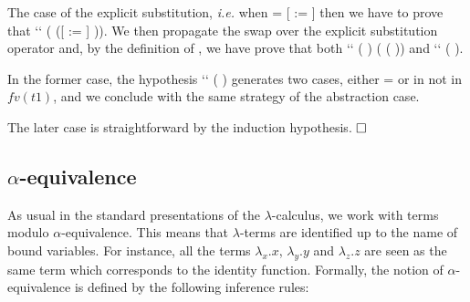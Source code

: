The case of the explicit substitution, {\it i.e.} when  = [ := ] then we have to prove that     ``  (   ([ := ] )). We then propagate the swap over the explicit substitution operator and, by the definition of , we have prove that both     ``  (   ) ( (   )) and     ``  (   ).
\begin{coqdoccode}
\end{coqdoccode}
In the former case, the hypothesis  ``   ( ) generates two cases, either  =  or  in not in $fv(t1)$, and we conclude with the same strategy of the abstraction case.
\begin{coqdoccode}
\end{coqdoccode}
The later case is straightforward by the induction hypothesis. $\hfill\Box$
\begin{coqdoccode}
\coqdocemptyline
\coqdocemptyline
\end{coqdoccode}
\subsection{$\alpha$-equivalence}



 As usual in the standard presentations of the $\lambda$-calculus, we work with terms modulo $\alpha$-equivalence. This means that $\lambda$-terms are identified up to the name of bound variables. For instance, all the terms $\lambda_x.x$, $\lambda_y.y$ and $\lambda_z.z$ are seen as the same term which corresponds to the identity function. Formally, the notion of $\alpha$-equivalence is defined by the following inference rules:




